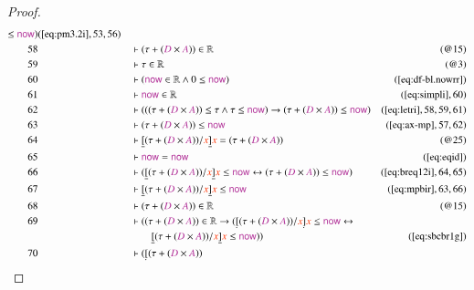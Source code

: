 \begin{proof}
\begin{align}
      \le \mathsf{\mc{now}}
      )&(\mbox{\ref{eq:pm3.2i}},53,56)\notag
  \\ 58 &&  & \vdash ( \tau + ( \mc{D} \times \mc{A} ) ) \in
      \mathbb{R}&(@15)\notag
  \\ 59 &&  & \vdash \tau \in \mathbb{R}&(@3)\notag
  \\ 60 &&  & \vdash ( \mathsf{\mc{now}} \in \mathbb{R} \wedge 0 \le
      \mathsf{\mc{now}}
      )&(\mbox{\ref{eq:df-bl.nowrr}})\notag
  \\ 61 &&  & \vdash \mathsf{\mc{now}} \in
      \mathbb{R}&(\mbox{\ref{eq:simpli}},60)\notag
  \\ 62 &&  & \vdash ( ( ( \tau + ( \mc{D} \times \mc{A} ) ) \le \tau \wedge
      \tau \le \mathsf{\mc{now}} ) \rightarrow ( \tau + (
      \mc{D} \times \mc{A} ) ) \le \mathsf{\mc{now}}
      )&(\mbox{\ref{eq:letri}},58,59,61)\notag
  \\ 63 &&  & \vdash ( \tau + ( \mc{D} \times \mc{A} ) ) \le
      \mathsf{\mc{now}}&(\mbox{\ref{eq:ax-mp}},57,62)\notag
  \\ 64 &&  & \vdash \underline{[} ( \tau + ( \mc{D} \times \mc{A} ) ) / \msc{x}
      \underline{]} \msc{x} = ( \tau + ( \mc{D} \times
      \mc{A} ) )&(@25)\notag
  \\ 65 &&  & \vdash \mathsf{\mc{now}} =
      \mathsf{\mc{now}}&(\mbox{\ref{eq:eqid}})\notag
  \\ 66 &&  & \vdash ( \underline{[} ( \tau + ( \mc{D} \times \mc{A} ) ) /
      \msc{x} \underline{]} \msc{x} \le \mathsf{\mc{now}}
      \leftrightarrow ( \tau + ( \mc{D} \times \mc{A} ) )
      \le \mathsf{\mc{now}}
      )&(\mbox{\ref{eq:breq12i}},64,65)\notag
  \\ 67 &&  & \vdash \underline{[} ( \tau + ( \mc{D} \times \mc{A} ) ) / \msc{x}
      \underline{]} \msc{x} \le
      \mathsf{\mc{now}}&(\mbox{\ref{eq:mpbir}},63,66)\notag
  \\ 68 &&  & \vdash ( \tau + ( \mc{D} \times \mc{A} ) ) \in
      \mathbb{R}&(@15)\notag
  \\ 69 &&  & \vdash ( ( \tau + ( \mc{D} \times \mc{A} ) ) \in \mathbb{R}
      \rightarrow ( \underaccent{\dot}{[} ( \tau + ( \mc{D}
      \times \mc{A} ) ) / \msc{x} \underaccent{\dot}{]}
      \msc{x} \le \mathsf{\mc{now}} \leftrightarrow \notag \\ & & & \qquad
      \underline{[} ( \tau + ( \mc{D} \times \mc{A} ) ) /
      \msc{x} \underline{]} \msc{x} \le \mathsf{\mc{now}} )
      )&(\mbox{\ref{eq:sbcbr1g}})\notag
  \\ 70 &&  & \vdash ( \underaccent{\dot}{[} ( \tau + ( \mc{D} \times \mc{A} ) )

\end{align}
\end{proof}
